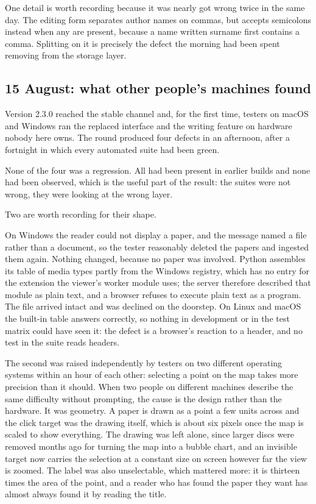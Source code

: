 \documentclass[11pt,a4paper]{article}
\begin{document}
One detail is worth recording because it was nearly got wrong twice in the same
day. The editing form separates author names on commas, but accepts semicolons
instead when any are present, because a name written surname first contains a
comma. Splitting on it is precisely the defect the morning had been spent
removing from the storage layer.

\subsection{15 August: what other people's machines found}

Version 2.3.0 reached the stable channel and, for the first time, testers on
macOS and Windows ran the replaced interface and the writing feature on
hardware nobody here owns. The round produced four defects in an afternoon,
after a fortnight in which every automated suite had been green.

None of the four was a regression. All had been present in earlier builds and
none had been observed, which is the useful part of the result: the suites were
not wrong, they were looking at the wrong layer.

Two are worth recording for their shape.

On Windows the reader could not display a paper, and the message named a file
rather than a document, so the tester reasonably deleted the papers and ingested
them again. Nothing changed, because no paper was involved. Python assembles its
table of media types partly from the Windows registry, which has no entry for
the extension the viewer's worker module uses; the server therefore described
that module as plain text, and a browser refuses to execute plain text as a
program. The file arrived intact and was declined on the doorstep. On Linux and
macOS the built-in table answers correctly, so nothing in development or in the
test matrix could have seen it: the defect is a browser's reaction to a header,
and no test in the suite reads headers.

The second was raised independently by testers on two different operating
systems within an hour of each other: selecting a point on the map takes more
precision than it should. When two people on different machines describe the
same difficulty without prompting, the cause is the design rather than the
hardware. It was geometry. A paper is drawn as a point a few units across and
the click target was the drawing itself, which is about six pixels once the map
is scaled to show everything. The drawing was left alone, since larger discs
were removed months ago for turning the map into a bubble chart, and an
invisible target now carries the selection at a constant size on screen however
far the view is zoomed. The label was also unselectable, which mattered more:
it is thirteen times the area of the point, and a reader who has found the
paper they want has almost always found it by reading the title.
\end{document}
